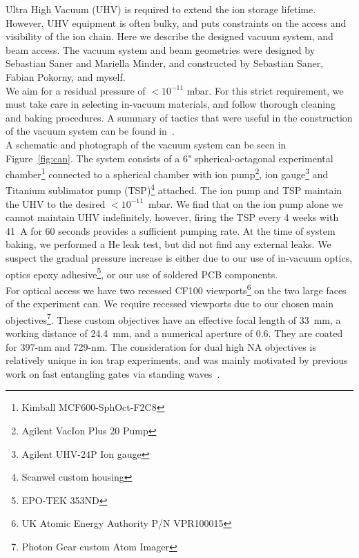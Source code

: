     Ultra High Vacuum (UHV) is required to extend the ion storage lifetime.
    However, UHV equipment is often bulky, and puts constraints on the access
    and visibility of the ion chain. Here we describe the designed vacuum
    system, and beam access.  The vacuum system and beam geometries were
    designed by Sebastian Saner and Mariella Minder, and constructed by
    Sebastian Saner, Fabian Pokorny, and myself.\\
    
    We aim for a residual pressure of $<10^{-11}$ mbar. For this strict
    requirement, we must take care in selecting in-vacuum materials, and follow
    thorough cleaning and baking procedures. A summary of tactics that were
    useful in the construction of the vacuum system can be found
    in~\cite{birnbaum_ultra-high_2005, wolf_cryogenic_2019}.\\
    A schematic and photograph of the vacuum system can be seen in
    Figure~\ref{fig:can}. The system consists of a 6" spherical-octagonal
    experimental chamber\footnote{Kimball MCF600-SphOct-F2C8} connected to a
    spherical chamber with ion pump\footnote{Agilent VacIon Plus 20 Pump}, ion
    gauge\footnote{Agilent UHV-24P Ion gauge} and Titanium sublimator pump
    (TSP)\footnote{Scanwel custom housing} attached. The ion pump and TSP
    maintain the UHV to the desired $<10^{-11}$~mbar. We find that on the ion
    pump alone we cannot maintain UHV indefinitely, however, firing the TSP
    every 4 weeks with 41~A for 60 seconds provides a sufficient pumping rate.
    At the time of system baking, we performed a He leak test, but did not find
    any external leaks. We suspect the gradual pressure increase is either due
    to our use of in-vacuum optics, optics epoxy adhesive\footnote{EPO-TEK
    353ND}, or our use of soldered PCB components.\\
    For optical access we have two recessed CF100 viewports\footnote{UK Atomic
    Energy Authority P/N VPR100015} on the two large faces of the experiment
    can. We require recessed viewports due to our chosen main
    objectives\footnote{Photon Gear custom Atom Imager}. These custom objectives
    have an effective focal length of 33~mm, a working distance of 24.4~mm, and
    a numerical aperture of 0.6. They are coated for 397-nm and 729-nm.
    The consideration for dual high NA objectives is relatively unique in ion trap experiments, and was mainly motivated by previous work on fast entangling gates via standing waves~\cite{saner_breaking_2023}. \\
